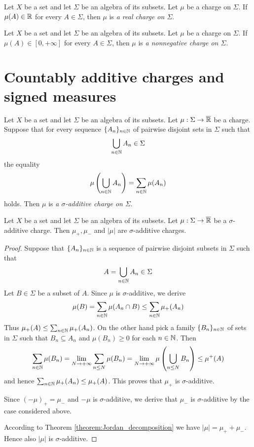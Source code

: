 \begin{definition}
    Let $X$ be a set and let $\Sigma$ be an algebra of its subsets. Let $\mu$ be a charge on $\Sigma$. If $\mu(A) \in {\mathbb R}$ for every $A \in \Sigma$, then $\mu$ is \textit{a real charge on $\Sigma$}.
\end{definition}

\begin{definition}
    Let $X$ be a set and let $\Sigma$ be an algebra of its subsets. Let $\mu$ be a charge on $\Sigma$. If $\mu(A) \in [0,+\infty]$ for every $A \in \Sigma$, then $\mu$ is \textit{a nonnegative charge on $\Sigma$}.
\end{definition}

\section{Countably additive charges and signed measures}

\begin{definition}
    Let $X$ be a set and let $\Sigma$ be an algebra of its subsets. Let $\mu:\Sigma \rightarrow \overline{{\mathbb R}}$ be a charge. Suppose that for every sequence $\{A_n\}_{n\in {\mathbb N}}$ of pairwise disjoint sets in $\Sigma$ such that
    $$\bigcup_{n\in {\mathbb N}}A_n \in \Sigma$$
    the equality
    $$\mu\left(\bigcup_{n\in {\mathbb N}}A_n\right) = \sum_{n \in {\mathbb N}}\mu(A_n)$$
    holds. Then $\mu$ is \textit{a $\sigma$-additive charge on $\Sigma$}.
\end{definition}

\begin{proposition}\label{proposition:sigma_additive_have_positive_and_negative_parts_which_are_sigma_additive}
    Let $X$ be a set and let $\Sigma$ be an algebra of its subsets. Let $\mu:\Sigma \rightarrow \overline{{\mathbb R}}$ be a $\sigma$-additive charge. Then $\mu_+,\mu_-$ and $|\mu|$ are $\sigma$-additive charges.
\end{proposition}
\begin{proof}
    Suppose that $\{A_n\}_{n\in {\mathbb N}}$ is a sequence of pairwise disjoint subsets in $\Sigma$ such that
    $$A = \bigcup_{n\in {\mathbb N}}A_n \in \Sigma$$
    Let $B \in \Sigma$ be a subset of $A$. Since $\mu$ is $\sigma$-additive, we derive
    $$\mu(B) = \sum_{n\in {\mathbb N}}\mu(A_n\cap B) \leq \sum_{n\in {\mathbb N}}\mu_+(A_n)$$
    Thus $\mu_+(A) \leq  \sum_{n\in {\mathbb N}}\mu_+(A_n)$. On the other hand pick a family $\{B_n\}_{n\in {\mathbb N}}$ of sets in $\Sigma$ such that $B_n\subseteq A_n$ and $\mu(B_n) \geq 0$ for each $n\in {\mathbb N}$. Then
    $$\sum_{n \in {\mathbb N}}\mu(B_n) = \lim_{N\rightarrow +\infty}\sum_{n\leq N}\mu(B_n) = \lim_{N \rightarrow +\infty}\mu\left(\bigcup_{n\leq N} B_n\right) \leq \mu^+(A)$$
    and hence $\sum_{n \in {\mathbb N}}\mu_+(A_n) \leq \mu_+(A)$. This proves that $\mu_+$ is $\sigma$-additive.

    Since $(-\mu)_+ = \mu_-$ and $-\mu$ is $\sigma$-additive, we derive that $\mu_-$ is $\sigma$-additive by the case considered above.

    According to Theorem \ref{theorem:Jordan_decomposition} we have $|\mu| = \mu_+ + \mu_-$. Hence also $|\mu|$ is $\sigma$-additive.
\end{proof}

